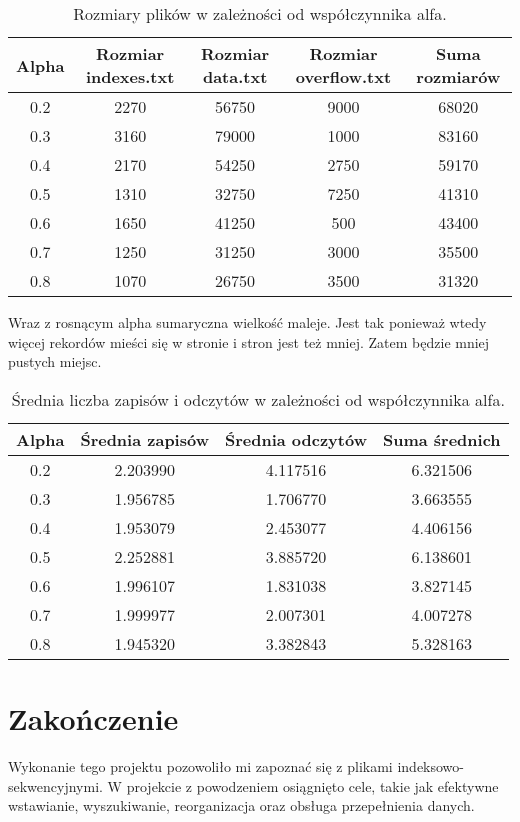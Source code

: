 \documentclass{article}
\begin{document}
    \begin{table}[H]
        \centering
        \begin{tabular}{ccccc}
        \toprule
        \textbf{Alpha} & \textbf{Rozmiar indexes.txt} & \textbf{Rozmiar data.txt} & \textbf{Rozmiar overflow.txt} & \textbf{Suma rozmiarów} \\
        \midrule
        0.2 & 2270 & 56750 & 9000  & 68020  \\
        0.3 & 3160 & 79000 & 1000  & 83160  \\
        0.4 & 2170 & 54250 & 2750  & 59170  \\
        0.5 & 1310 & 32750 & 7250  & 41310  \\
        0.6 & 1650 & 41250 & 500   & 43400  \\
        0.7 & 1250 & 31250 & 3000  & 35500  \\
        0.8 & 1070 & 26750 & 3500  & 31320  \\
        \bottomrule
        \end{tabular}
        \caption{Rozmiary plików w zależności od współczynnika alfa.}
        \label{tab:file_sizes}
    \end{table}

    \noindent Wraz z rosnącym alpha sumaryczna wielkość maleje. Jest tak ponieważ wtedy więcej rekordów mieści się w stronie i stron jest też mniej. 
    Zatem będzie mniej pustych miejsc.
                
    \begin{table}[H]
        \centering
        \begin{tabular}{cccc}
        \toprule
        \textbf{Alpha} & \textbf{Średnia zapisów} & \textbf{Średnia odczytów} & \textbf{Suma średnich} \\
        \midrule
        0.2 & 2.203990 & 4.117516 & 6.321506 \\
        0.3 & 1.956785 & 1.706770 & 3.663555 \\
        0.4 & 1.953079 & 2.453077 & 4.406156 \\
        0.5 & 2.252881 & 3.885720 & 6.138601 \\
        0.6 & 1.996107 & 1.831038 & 3.827145 \\
        0.7 & 1.999977 & 2.007301 & 4.007278 \\
        0.8 & 1.945320 & 3.382843 & 5.328163 \\
        \bottomrule
        \end{tabular}
        \caption{Średnia liczba zapisów i odczytów w zależności od współczynnika alfa.}
        \label{tab:average_operations}
    \end{table}



    \section*{Zakończenie}

    Wykonanie tego projektu pozowoliło mi zapoznać się z plikami indeksowo-sekwencyjnymi. W projekcie z powodzeniem osiągnięto cele, takie jak efektywne wstawianie, wyszukiwanie, reorganizacja oraz obsługa przepełnienia danych.
   
\end{document}
